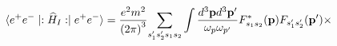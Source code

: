 \begin{equation*}
\langle e^{+}e^{-}\mid :\widehat{H}_{I}:\mid e^{+}e^{-}\rangle =\frac{%
e^{2}m^{2}}{\left( 2\pi \right) ^{3}}\underset{s_{1}^{\prime }s_{2}^{\prime
}s_{1}s_{2}}{\sum }\int \frac{d^{3}\mathbf{p}d^{3}\mathbf{p}^{\prime }}{%
\omega _{p}\omega _{p^{\prime }}}F_{s_{1}s_{2}}^{\ast }(\mathbf{p}%
)F_{s_{1}^{\prime }s_{2}^{\prime }}(\mathbf{p}^{\prime })\times
\end{equation*}

